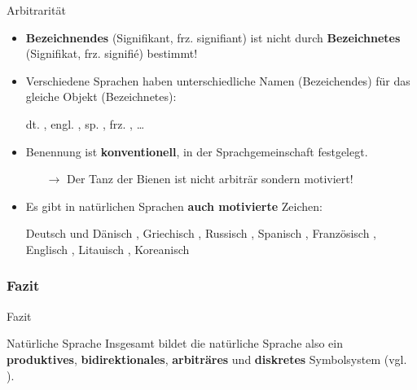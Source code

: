 \begin{frame}{Arbitrarität}

\begin{itemize}
	\item<1-> \textbf{Bezeichnendes} (Signifikant, frz. signifiant) ist nicht durch \textbf{Bezeichnetes} (Signifikat, frz. signifié) bestimmt!
	\item[]
	\item<2-> Verschiedene Sprachen haben unterschiedliche Namen (Bezeichendes) für das gleiche Objekt (Bezeichnetes):

\pause

\ea dt. , engl. , sp. , frz. , \ldots
\z

\pause 

	\item Benennung ist \textbf{konventionell}, \dash in der Sprachgemeinschaft festgelegt.

	\begin{itemize}
		\item[$\rightarrow$] Der Tanz der Bienen ist nicht arbiträr sondern motiviert!
	\end{itemize}

\pause
		
	\item Es gibt in natürlichen Sprachen \textbf{auch motivierte} Zeichen:

\ea Deutsch und Dänisch , Griechisch , Russisch , Spanisch , Französisch , Englisch , Litauisch , Koreanisch 
\z

\end{itemize}

\end{frame}


\subsubsection{Fazit}
\begin{frame}{Fazit}
		
	\begin{block}{Natürliche Sprache}
			Insgesamt bildet die natürliche Sprache also ein \textbf{produktives}, \textbf{bidirektionales}, \textbf{arbiträres} und \textbf{diskretes} Symbolsystem (vgl. \citealp{Luedeling2009a}).
	\end{block}

\end{frame}	
